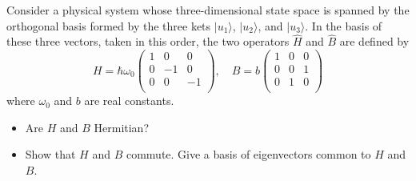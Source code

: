 \documentclass[12pt,a4paper]{article}
\newenvironment{problem}[2][Problem]{\begin{trivlist}
\item[\hskip \labelsep {\bfseries #1}\hskip \labelsep {\bfseries #2.}]}{\end{trivlist}}
\begin{document}
\begin{problem}{4}
[C-T exercise 2-11] Consider a physical system whose three-dimensional state space is spanned by the orthogonal basis formed by the three kets $|u_1\rangle$, $|u_2\rangle$, and $|u_3\rangle$.  In the basis of these three vectors, taken in this order,  the two operators $\hat{H}$ and $\hat{B}$ are defined by
\[
H=\hbar\omega_0\left(\begin{array}{ccc}
1&0&0\\
0&-1&0\\
0&0&-1\\
\end{array}\right),\quad B=b\left(\begin{array}{ccc}
1&0&0\\
0&0&1\\
0&1&0\\
\end{array}\right)
\]
where $\omega_0$ and $b$ are real constants.
\begin{itemize}
\item[(a)] Are $H$ and $B$ Hermitian?
\item[(b)] Show that $H$ and $B$ commute. Give a basis of eigenvectors common to $H$ and $B$.
\end{itemize}
\end{problem}
\end{document}
